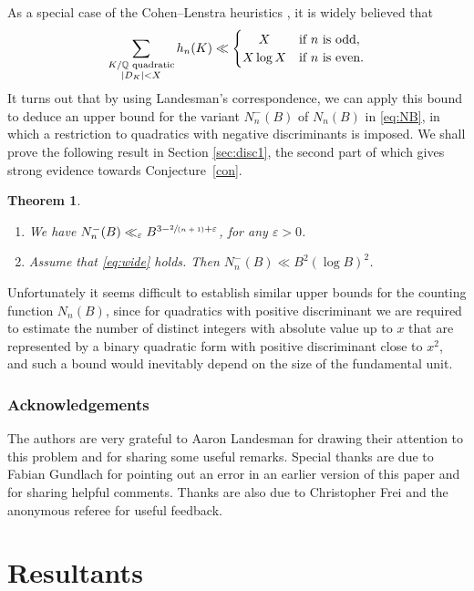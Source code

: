 \documentclass[JEP,XML,SOM,Unicode]{cedram}
\newcommand{\spfrac}[2]{\sfrac{#1}{(#2)}}
\newcommand{\QQ}{\mathbb{Q}}\let\Q\QQ
\let\ve\varepsilon
\newtheorem{theorem}{Theorem}[section]
\begin{document}
As a special case of the Cohen--Lenstra heuristics \cite{CL},
it is widely believed that
\begin{equation}\label{eq:wide}
\sum_{
\substack{K/\QQ \text{ quadratic}\\
|D_K|<X
}} h_n(K)\ll
\begin{cases}
\hfil X&\text{if $n$ is odd},\\
\hfil X\log X&\text{if $n$ is even}.
\end{cases}
\end{equation}
It turns out that by using Landesman's correspondence, we can
apply this bound to deduce an upper bound for the variant $N_n^-(B)$ of $N_n(B)$ in \eqref{eq:NB}, in which a restriction to quadratics with
negative discriminants is imposed.
We shall prove the following result in Section \ref{sec:disc1}, the second part of which gives strong evidence towards Conjecture~\ref{con}.

\skpt
\begin{theorem}\label{t:lama}
\begin{enumerate}
\item
We have $N_n^-(B)\ll_\ve
B^{3-\spfrac{2}{n+1}+\ve}$,
for any $\ve>0$.
\item
Assume that \eqref{eq:wide} holds. Then $N_n^-(B)\ll B^2(\log B)^2$.
\end{enumerate}
\end{theorem}

Unfortunately it seems difficult to establish similar upper bounds for the counting function $N_n(B)$, since for quadratics with positive discriminant we are required to
estimate the number of distinct integers with absolute value up to $x$ that are represented by a binary quadratic form with positive discriminant close to $x^2$, and such a bound would inevitably depend on the size of the fundamental unit.

\subsubsection*{Acknowledgements}
The authors are very grateful to Aaron Landesman
for drawing their attention to this problem and for sharing some useful remarks.
Special thanks are due to Fabian Gundlach for pointing out an error in an earlier version of this paper and for sharing helpful comments. Thanks are also due to
Christopher Frei and the anonymous referee for useful feedback.

\section{Resultants}
\end{document}

